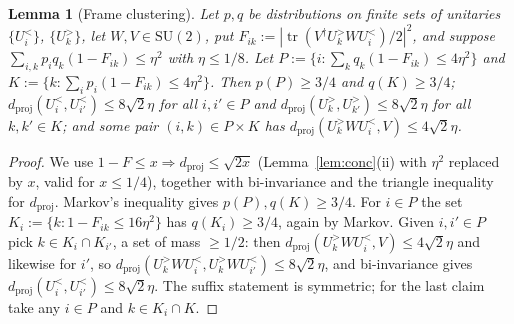 \documentclass[aps,prx,twocolumn,superscriptaddress,nofootinbib,longbibliography]{revtex4-2}
\theoremstyle{plain}
\newtheorem{lemma}{Lemma}
\theoremstyle{definition}
\theoremstyle{remark}
\newcommand{\dproj}{d_{\mathrm{proj}}}
\newcommand{\SU}{\mathrm{SU}(2)}
\newcommand{\tr}{\operatorname{tr}}
\begin{document}
\begin{lemma}[Frame clustering]\label{lem:cluster}
Let $p,q$ be distributions on finite sets of unitaries $\{U^<_i\}$, $\{U^>_k\}$, let $W,V\in\SU$, put $F_{ik}:=|\tr(V^\dagger U^>_kWU^<_i)/2|^2$, and suppose $\sum_{i,k}p_iq_k(1-F_{ik})\le\eta^2$ with $\eta\le1/8$. Let $P:=\{i:\sum_kq_k(1-F_{ik})\le4\eta^2\}$ and $K:=\{k:\sum_ip_i(1-F_{ik})\le4\eta^2\}$. Then $p(P)\ge3/4$ and $q(K)\ge3/4$; $\dproj(U^<_i,U^<_{i'})\le8\sqrt2\eta$ for all $i,i'\in P$ and $\dproj(U^>_k,U^>_{k'})\le8\sqrt2\eta$ for all $k,k'\in K$; and some pair $(i,k)\in P\times K$ has $\dproj(U^>_kWU^<_i,V)\le4\sqrt2\eta$.
\end{lemma}
\begin{proof}
We use $1-F\le x\Rightarrow\dproj\le\sqrt{2x}$ (Lemma~\ref{lem:conc}(ii) with $\eta^2$ replaced by $x$, valid for $x\le1/4$), together with bi-invariance and the triangle inequality for $\dproj$. Markov's inequality gives $p(P),q(K)\ge3/4$. For $i\in P$ the set $K_i:=\{k:1-F_{ik}\le16\eta^2\}$ has $q(K_i)\ge3/4$, again by Markov. Given $i,i'\in P$ pick $k\in K_i\cap K_{i'}$, a set of mass $\ge1/2$: then $\dproj(U^>_kWU^<_i,V)\le4\sqrt2\eta$ and likewise for $i'$, so $\dproj(U^>_kWU^<_i,U^>_kWU^<_{i'})\le8\sqrt2\eta$, and bi-invariance gives $\dproj(U^<_i,U^<_{i'})\le8\sqrt2\eta$. The suffix statement is symmetric; for the last claim take any $i\in P$ and $k\in K_i\cap K$.
\end{proof}
\end{document}
